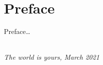 \chapter*{Preface}

Preface\ldots

\begin{flushright}
{\makeatletter\itshape
    \@author \\
    The world is yours, March 2021
\makeatother}
\end{flushright}

